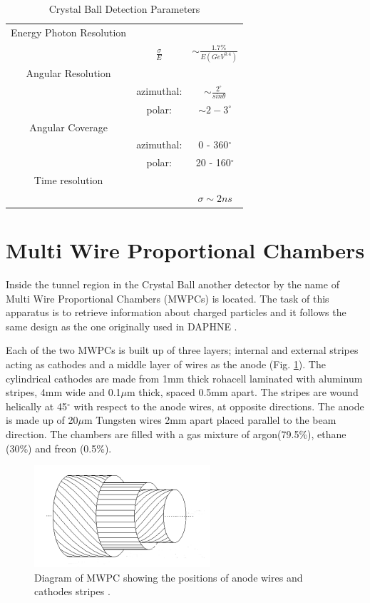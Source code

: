 \newcommand{\rw}[1]{\renewcommand{\arraystretch}{#1}}
\begin{table}[ht]
\rw{1.5} 
\caption{Crystal Ball Detection Parameters}
\centering
\begin{tabular}{c c c}
\hline\hline
Energy Photon Resolution & &  \\
 & $\frac{\sigma}{E}$ & $\sim \frac{1.7\%}{E(GeV^{0.4})}$ \\
\hline
Angular Resolution & & \\
 & azimuthal: & $\sim \frac{2^{\circ}}{sin\theta}$ \\
 & polar: & $\sim 2-3^{\circ}$ \\
\hline
Angular Coverage & & \\
 & azimuthal: & 0 - 360$^{\circ}$ \\
 & polar: & 20 - 160$^{\circ}$ \\
\hline
Time resolution & & \\
 & & $\sigma \sim 2ns$ \\
\hline\hline
\end{tabular}
\label{table_cbparam}
\end{table} 
 

\section{Multi Wire Proportional Chambers}

\indent Inside the tunnel region in the Crystal Ball another detector by the name of Multi Wire Proportional Chambers (MWPCs) is located. The task of this apparatus is to retrieve  information  about  charged particles and it follows  the  same design  as the  one originally used in DAPHNE \cite{audit}.

\indent Each of the two MWPCs is built up of three layers; internal and external stripes acting as cathodes and a middle layer of wires as the anode (Fig. \ref{mwpc}). The cylindrical  cathodes  are  made  from  1mm  thick  rohacell  laminated  with aluminum stripes, 4mm wide and  0.1$\mu$m thick, spaced 0.5mm apart. The stripes are  wound  helically  at  45$^{\circ}$  with  respect  to  the  anode  wires, at  opposite directions.  The  anode  is  made  up  of  20$\mu$m  Tungsten  wires  2mm  apart placed parallel to the beam direction. The chambers are filled with a gas mixture of argon(79.5\%), ethane (30\%) and freon (0.5\%).

\begin{figure}[H]
\begin{center}
\includegraphics[scale=1.0]{pictures/png/mwpc.png}
\caption{Diagram of MWPC showing the positions of anode wires and cathodes stripes \cite{jalbert}.}
\label{mwpc}
\end{center}
\end{figure}


